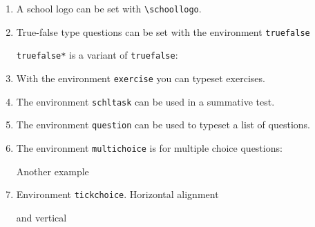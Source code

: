 \documentclass[12pt,a4page]{article}
\def\cellwidth{0.4\textwidth}
\newcommand{\miniexample}[3][t]{%
  \parbox[#1][#3][t]{\cellwidth}{#2}
}
\newcommand{\codeexample}[3][c]{%
  \colorbox[HTML]{b0c4be}{\miniexample[#1]{}{#3}}
}
\newcommand{\textexample}[3][c]{%
  {\footnotesize
    \colorbox[gray]{0.9}{\miniexample[#1]{}{#3}}%
  }
}
\newcommand{\examplerow}[3][10pt]{%
  \par\noindent\strut\hfill\codeexample{#2}{#3}\hspace{#1}\textexample{#2}{#3}\hfill\strut
}
\newlength{\exheight}
\begin{document}
\begin{enumerate}
  \newpage

\item A school logo can be set with \verb|\schoollogo|.
  \setlength{\exheight}{62pt}
  \examplerow{exampleMacroSchoollogo.tex}{\exheight}
\item True-false type questions can be set with the environment \verb|truefalse|\\
  \setlength{\exheight}{85pt}
  \setlength{\truefalselength}{20pt}
  \examplerow{exampleEnvirTruefalse01.tex}{\exheight}
\noindent \verb|truefalse*| is a variant of \verb|truefalse|:
\setlength{\exheight}{95pt}
\setlength{\truefalselength}{30pt}
\examplerow{exampleEnvirTruefalse02.tex}{\exheight}
\item With the environment \texttt{exercise} you can typeset exercises.
  \setlength{\exheight}{193pt}
  \examplerow{exampleEnvirExercise.tex}{\exheight}

  \newpage

\item The environment \texttt{schltask} can be used in a summative test.
  \setlength{\exheight}{86pt}
  \examplerow{exampleEnvirSchltask.tex}{\exheight}
\item The environment \verb|question| can be used to typeset a list of questions.
  \setlength{\exheight}{61pt}
  \examplerow{exampleEnvirQuestion.tex}{\exheight}
\item The environment \verb|multichoice| is for multiple choice questions:
  \setlength{\exheight}{72pt}
  \examplerow{exampleEnvirMultichoice01.tex}{\exheight}

  Another example
  \setlength{\exheight}{85pt}
  \examplerow{exampleEnvirMultichoice02.tex}{\exheight}
\item Environment \texttt{tickchoice}. Horizontal alignment
  \setlength{\exheight}{60pt}
  \examplerow{exampleEnvirTickchoice01.tex}{\exheight}

  and vertical

  \setlength{\exheight}{60pt}
  \examplerow{exampleEnvirTickchoice02.tex}{\exheight}
\end{enumerate}
\end{document}
